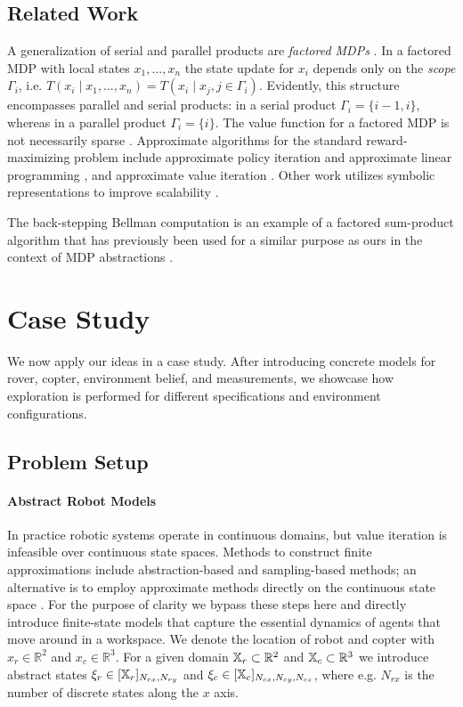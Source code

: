 \documentclass[conference]{IEEEtran}
\renewcommand{\cite}[1]{\citep{#1}}
\begin{document}
\subsection{Related Work}
\label{sub:factored_mdp_work}

A generalization of serial and parallel products are \emph{factored MDPs} \cite{Boutilier2000}. In a factored MDP with local states $x_1, \ldots, x_n$ the state update for $x_i$ depends only on the \emph{scope} $\Gamma_i$, i.e. $T(x_i \mid x_1, \ldots, x_n) = T(x_i \mid x_j, j \in \Gamma_i)$. Evidently, this structure encompasses parallel and serial products: in a serial product $\Gamma_i = \{ i-1, i \}$, whereas in a parallel product $\Gamma_i = \{ i \}$. The value function for a factored MDP is not necessarily sparse \cite{Guestrin2003}. Approximate algorithms for the standard reward-maximizing problem include approximate policy iteration and approximate linear programming \cite{Guestrin2003}, and approximate value iteration \cite{Szita2008}. Other work utilizes symbolic representations to improve scalability \cite{Boutilier2000}.

The back-stepping Bellman computation is an example of a factored sum-product algorithm \cite{Kschischang2001} that has previously been used for a similar purpose as ours in the context of MDP abstractions \cite{EsmaeilZadehSoudjani2017}.


\section{Case Study}
\label{sec:casestudy}

We now apply our ideas in a case study. After introducing concrete models for rover, copter, environment belief, and measurements, we showcase how exploration is performed for different specifications and environment configurations.

\subsection{Problem Setup}

\paragraph{Abstract Robot Models}

In practice robotic systems operate in continuous domains, but value iteration is infeasible over continuous state spaces. Methods to construct finite approximations include abstraction-based \cite{Zamani2015} and sampling-based \cite{Kavraki1996, Agha-mohammadi2014} methods; an alternative is to employ approximate methods directly on the continuous state space \cite{Powell2011}. For the purpose of clarity we bypass these steps here and directly introduce finite-state models that capture the essential dynamics of agents that move around in a workspace. We denote the location of robot and copter with $x_r \in \mathbb{R}^2$ and $x_c \in \mathbb{R}^3$. For a given domain $\mathbb{X}_r \subset \mathbb{R}^2$ and $\mathbb{X}_c \subset \mathbb{R}^3$ we introduce abstract states $\xi_r \in [\mathbb{X}_r]_{N_{rx}, N_{ry}}$ and $\xi_c \in [\mathbb{X}_c]_{N_{cx}, N_{cy}, N_{cz}}$, where e.g. $N_{rx}$ is the number of discrete states along the $x$ axis.
\end{document}
